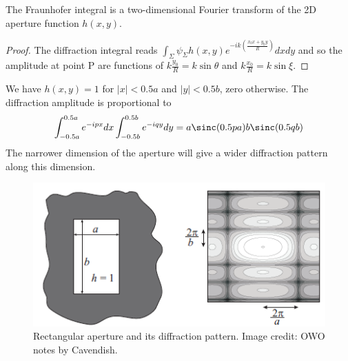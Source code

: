 \documentclass[a4paper]{article}
\begin{document}
\begin{cor}
The Fraunhofer integral is a two-dimensional Fourier transform of the 2D aperture function $h(x,y)$.
\end{cor}
\begin{proof}
The diffraction integral reads $\int_\Sigma\psi_\Sigma h(x,y)e^{-ik(\frac{x_0x+y_0y}{R})}dxdy$ and so the amplitude at point P are functions of $k\frac{y_0}{R}=k\sin\theta$ and $k\frac{x_0}{R}=k\sin\xi$.
\end{proof}
\begin{eg}
We have $h(x,y)=1$ for $|x|<0.5a$ and $|y|<0.5b$, zero otherwise. The diffraction amplitude is proportional to
$$\int_{-0.5a}^{0.5a}e^{-ipx}dx\int_{-0.5b}^{0.5b}e^{-iqy}dy=a\sinc(0.5pa)b\sinc(0.5qb)$$
The narrower dimension of the aperture will give a wider diffraction pattern along this dimension.
\end{eg}
\begin{figure}[H]
    \centering
    \includegraphics[scale=0.55]{rectangularaperture.PNG}
    \caption{Rectangular aperture and its diffraction pattern. Image credit: OWO notes by Cavendish.}
\end{figure}
\end{document}
